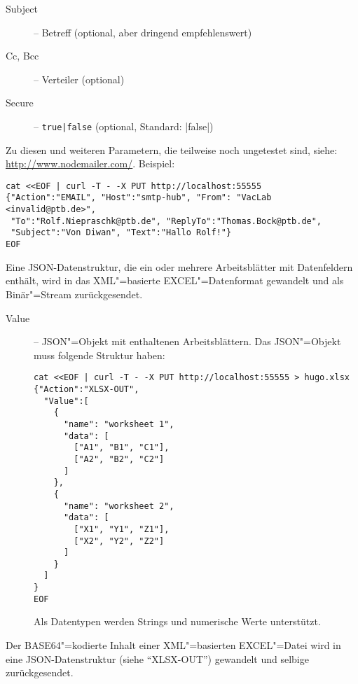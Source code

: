 \documentclass[titlepage=false,toc=nobibliography]{vl-report}
\newcommand*\action[1]{\fbox{\nolinkurl{#1}}\medskip\par}
\begin{document}
\begin{description}
\begin{description}
\begin{description}
        \item[Subject] -- Betreff (optional, aber dringend empfehlenswert)

        \item[Cc, Bcc] -- Verteiler (optional)
        
        \item[Secure] -- \verb+true|false+ (optional, Standard: |false|)

      \end{description}

      \noindent Zu diesen und weiteren Parametern, die teilweise noch ungetestet 
      sind, siehe: \url{http://www.nodemailer.com/}. Beispiel:
\begin{lstlisting}[language={}]
cat <<EOF | curl -T - -X PUT http://localhost:55555
{"Action":"EMAIL", "Host":"smtp-hub", "From": "VacLab <invalid@ptb.de>", 
 "To":"Rolf.Niepraschk@ptb.de", "ReplyTo":"Thomas.Bock@ptb.de",
 "Subject":"Von Diwan", "Text":"Hallo Rolf!"}
EOF
\end{lstlisting}

    \item \action{XLSX-OUT}

      \noindent Eine JSON-Datenstruktur, die ein oder mehrere Arbeitsblätter
      mit Datenfeldern enthält, wird in das XML"=basierte EXCEL"=Datenformat
      gewandelt und als Binär"=Stream zurückgesendet.

      \begin{description}

        \item[Value] -- JSON"=Objekt mit enthaltenen Arbeitsblättern. Das
        JSON"=Objekt muss folgende Struktur haben:
\begin{lstlisting}[language={}]
cat <<EOF | curl -T - -X PUT http://localhost:55555 > hugo.xlsx
{"Action":"XLSX-OUT",
  "Value":[
    {
      "name": "worksheet 1",
      "data": [
        ["A1", "B1", "C1"],
        ["A2", "B2", "C2"]
      ]
    }, 
    {
      "name": "worksheet 2",
      "data": [
        ["X1", "Y1", "Z1"],
        ["X2", "Y2", "Z2"]
      ]
    }
  ]
}
EOF
\end{lstlisting}
      Als Datentypen werden Strings und numerische Werte unterstützt.
      \end{description}

    \item \action{XLSX-IN}

      \noindent Der BASE64"=kodierte Inhalt einer XML"=basierten EXCEL"=Datei
      wird in eine JSON-Datenstruktur (siehe "`XLSX-OUT"') gewandelt und
      selbige zurückgesendet.


\end{description}
\end{description}
\end{document}
